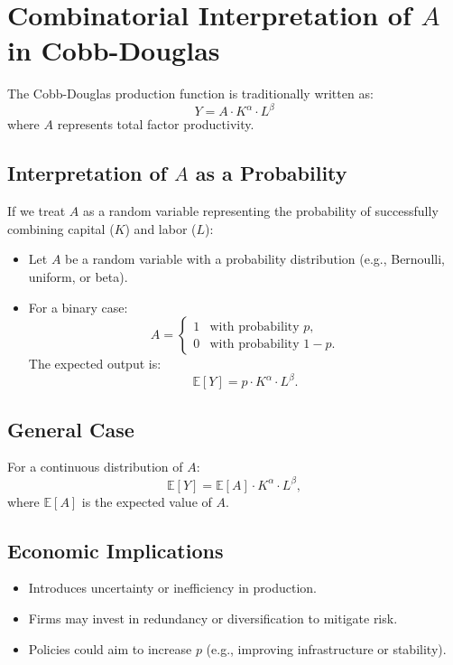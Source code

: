 \documentclass{article}
\begin{document}
\section*{Combinatorial Interpretation of \( A \) in Cobb-Douglas}

The Cobb-Douglas production function is traditionally written as:
\[
Y = A \cdot K^\alpha \cdot L^\beta
\]
where \( A \) represents total factor productivity.

\subsection*{Interpretation of \( A \) as a Probability}
If we treat \( A \) as a random variable representing the probability of successfully combining capital (\( K \)) and labor (\( L \)):

\begin{itemize}
    \item Let \( A \) be a random variable with a probability distribution (e.g., Bernoulli, uniform, or beta).
    \item For a binary case:
    \[
    A = \begin{cases}
    1 & \text{with probability } p, \\
    0 & \text{with probability } 1-p.
    \end{cases}
    \]
    The expected output is:
    \[
    \mathbb{E}[Y] = p \cdot K^\alpha \cdot L^\beta.
    \]
\end{itemize}

\subsection*{General Case}
For a continuous distribution of \( A \):
\[
\mathbb{E}[Y] = \mathbb{E}[A] \cdot K^\alpha \cdot L^\beta,
\]
where \( \mathbb{E}[A] \) is the expected value of \( A \).

\subsection*{Economic Implications}
\begin{itemize}
    \item Introduces uncertainty or inefficiency in production.
    \item Firms may invest in redundancy or diversification to mitigate risk.
    \item Policies could aim to increase \( p \) (e.g., improving infrastructure or stability).
\end{itemize}
\end{document}
